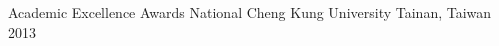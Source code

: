 

\begin{cvhonors}

  \cvhonor
    {Academic Excellence Awards} %
    {National Cheng Kung University} %
    {Tainan, Taiwan} %
    {2013} %




\end{cvhonors}






